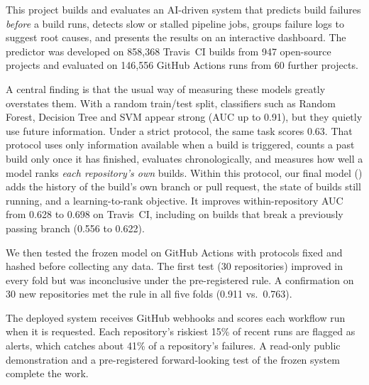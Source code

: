 This project builds and evaluates an AI-driven system that predicts build failures \emph{before} a build runs, detects slow or stalled pipeline jobs, groups failure logs to suggest root causes, and presents the results on an interactive dashboard. The predictor was developed on 858,368 Travis~CI builds from 947 open-source projects and evaluated on 146,556 GitHub Actions runs from 60 further projects.

A central finding is that the usual way of measuring these models greatly overstates them. With a random train/test split, classifiers such as Random Forest, Decision Tree and SVM appear strong (AUC up to 0.91), but they quietly use future information. Under a strict protocol, the same task scores 0.63. That protocol uses only information available when a build is triggered, counts a past build only once it has finished, evaluates chronologically, and measures how well a model ranks \emph{each repository's own} builds. Within this protocol, our final model (\tierE) adds the history of the build's own branch or pull request, the state of builds still running, and a learning-to-rank objective. It improves within-repository AUC from 0.628 to 0.698 on Travis~CI, including on builds that break a previously passing branch (0.556 to 0.622).

We then tested the frozen model on GitHub Actions with protocols fixed and hashed before collecting any data. The first test (30 repositories) improved in every fold but was inconclusive under the pre-registered rule. A confirmation on 30 new repositories met the rule in all five folds (0.911 vs.\ 0.763).

The deployed system receives GitHub webhooks and scores each workflow run when it is requested. Each repository's riskiest 15\% of recent runs are flagged as alerts, which catches about 41\% of a repository's failures. A read-only public demonstration and a pre-registered forward-looking test of the frozen system complete the work.

\clearpage

